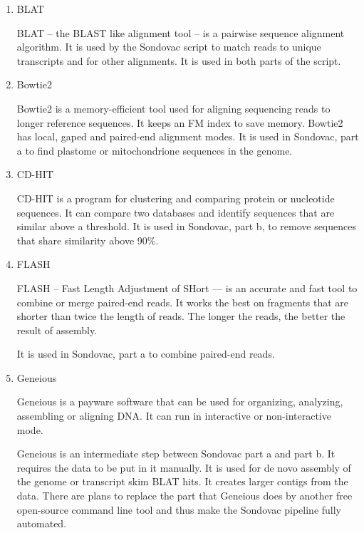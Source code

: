 \begin{enumerate}


\item BLAT

BLAT -- the BLAST like alignment tool -- is a pairwise sequence alignment algorithm. \cite{kent2002blat}
It is used by the Sondovac script to match reads to unique transcripts and for other alignments. It is used 
in both parts of the script. 

\item Bowtie2

Bowtie2 is a memory-efficient tool used for aligning sequencing reads to longer reference sequences. It keeps an FM index to save memory. Bowtie2 has 
local, gaped and paired-end alignment modes. \cite{bowtie2}
It is used in Sondovac, part a to find plastome or mitochondrione sequences in the genome. 

\item CD-HIT

CD-HIT is a program for clustering and comparing protein or nucleotide sequences. It can compare two databases and identify sequences that 
are similar above a threshold. \cite{cd-hit}
It is used in Sondovac, part b, to remove sequences that share similarity above 90\%. 



\item FLASH

FLASH -- Fast Length Adjustment of SHort --- is an accurate and fast tool to combine or merge paired-end reads. It works the best 
on fragments that are shorter than twice the length of reads. The longer the reads, the better the result of assembly. 
\cite{flash}

It is used in Sondovac, part a to combine paired-end reads. 

\item Geneious

Geneious is a payware software that can be used for organizing, analyzing, assembling or aligning DNA. It can run in interactive or non-interactive mode. 

Geneious is an intermediate step between Sondovac part a and part b. It requires the data to be put in it manually. It is used for de novo assembly 
of the genome or transcript skim BLAT hits. It creates larger contigs from the data. 
There are plans to replace the part that Geneious does by another free open-source command line tool and thus make the Sondovac pipeline fully automated. 


\end{enumerate}
